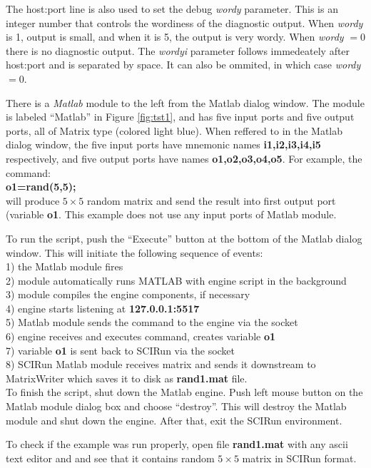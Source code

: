 \documentclass[12pt]{IEEEtran}
\newcommand{\sr}{SCIRun}
\begin{document}
The host:port line is also used to set the debug {\it wordy} parameter.
This is an integer number that controls the wordiness
of the diagnostic output. When {\it wordy} is 1, output is small, and
when it is 5, the output is very wordy. When {\it wordy} $=0$ there
is no diagnostic output. The {\it wordyi} parameter follows immedeately after
host:port and is separated by space. It can also be ommited, in which
case {\it wordy} $=0$.

There is a {\it Matlab} module to the left from the Matlab dialog window. 
The module is labeled ``Matlab'' in Figure \ref{fig:tst1}, and has five input
ports and five output ports, all of Matrix type (colored light blue). 
When reffered to in the Matlab dialog window, the five input ports have mnemonic 
names {\bf i1,i2,i3,i4,i5} respectively, and five output ports have
names {\bf o1,o2,o3,o4,o5}. For example, the command: \\
{\bf o1=rand(5,5);} \\
will produce $5 \times 5$ random matrix and send the result
into first output port (variable {\bf o1}. This example does
not use any input ports of Matlab module.

To run the script, push the ``Execute'' button at the bottom of the
Matlab dialog window. This will initiate the following
sequence of events: \\
1) the Matlab module fires \\
2) module automatically runs MATLAB with engine script in the background  \\
3) module compiles the engine components, if necessary \\
4) engine starts listening at {\bf 127.0.0.1:5517} \\
5) Matlab module sends the command to the engine via the socket\\
6) engine receives and executes command, creates variable {\bf o1} \\
7) variable {\bf o1} is sent back to \sr{} via the socket \\
8) \sr{} Matlab module receives matrix and sends it downstream
   to MatrixWriter which saves it to disk as {\bf rand1.mat} file. \\

To finish the script, shut down the Matlab engine. 
Push left mouse button on the
Matlab module dialog box and choose ``destroy''. This will destroy
the Matlab module and shut down the engine. After that, exit
the \sr{} environment. 

To check if the example was run properly, open file {\bf rand1.mat }
with any ascii text editor and and see that it contains random
$5 \times 5$ matrix in \sr{} format. 
\end{document}
